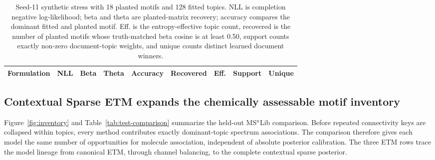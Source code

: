 \documentclass[10pt,a4paper]{article}
\begin{document}
\begin{table}[H]
\centering
\small
\caption{Seed-11 synthetic stress with 18 planted motifs and 128 fitted topics.
NLL is completion negative log-likelihood; beta and theta are planted-matrix
recovery; accuracy compares the dominant fitted and planted motif. Eff. is the
entropy-effective topic count, recovered is the number of planted motifs whose
truth-matched beta cosine is at least 0.50, support counts exactly non-zero
document-topic weights, and unique counts distinct learned document winners.}
\label{tab:high-k}
\begin{tabular}{@{}lrrrrrrrr@{}}
\toprule
Formulation & NLL & Beta & Theta & Accuracy & Recovered & Eff. & Support & Unique \\
\midrule

\end{tabular}
\end{table}

\subsection{Contextual Sparse ETM expands the chemically assessable motif inventory}

Figure~\ref{fig:inventory} and Table~\ref{tab:test-comparison} summarize the
held-out MS$^{n}$Lib comparison. Before repeated connectivity keys are collapsed
within topics, every method contributes exactly \TestSpectra{} dominant-topic
spectrum associations. The comparison therefore gives each model the same
number of opportunities for molecule association, independent of absolute
posterior calibration. The three ETM rows trace the model lineage from canonical
ETM, through channel balancing, to the complete contextual sparse posterior.
\end{document}
